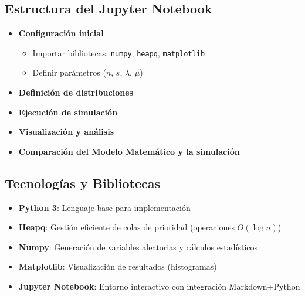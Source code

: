 \documentclass[a4paper, 12pt]{article}
\begin{document}
\subsection*{Estructura del Jupyter Notebook}
\begin{itemize}
    \item \textbf{Configuración inicial}
    \begin{itemize}
        \item Importar bibliotecas: \texttt{numpy}, \texttt{heapq}, \texttt{matplotlib}
        \item Definir parámetros ($n$, $s$, $\lambda$, $\mu$)
    \end{itemize}
    
    \item \textbf{Definición de distribuciones}

    \item \textbf{Ejecución de simulación}

    \item \textbf{Visualización y análisis}
    
    \item \textbf{Comparación del Modelo Matemático y la simulación}
\end{itemize}

\subsection*{Tecnologías y Bibliotecas}
\begin{itemize}
    \item \textbf{Python 3}: Lenguaje base para implementación
    \item \textbf{Heapq}: Gestión eficiente de colas de prioridad (operaciones $O(\log n)$)
    \item \textbf{Numpy}: Generación de variables aleatorias y cálculos estadísticos
    \item \textbf{Matplotlib}: Visualización de resultados (histogramas)
    \item \textbf{Jupyter Notebook}: Entorno interactivo con integración Markdown+Python
\end{itemize}
\end{document}
